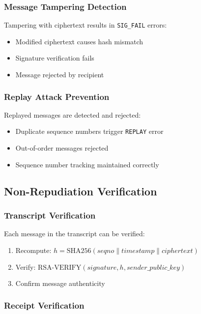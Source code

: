 \documentclass[runningheads]{llncs}
\begin{document}
\subsubsection{Message Tampering Detection}

Tampering with ciphertext results in \texttt{SIG\_FAIL} errors:
\begin{itemize}
    \item Modified ciphertext causes hash mismatch
    \item Signature verification fails
    \item Message rejected by recipient
\end{itemize}

\subsubsection{Replay Attack Prevention}

Replayed messages are detected and rejected:
\begin{itemize}
    \item Duplicate sequence numbers trigger \texttt{REPLAY} error
    \item Out-of-order messages rejected
    \item Sequence number tracking maintained correctly
\end{itemize}

\subsection{Non-Repudiation Verification}

\subsubsection{Transcript Verification}

Each message in the transcript can be verified:
\begin{enumerate}
    \item Recompute: $h = \text{SHA256}(seqno \| timestamp \| ciphertext)$
    \item Verify: $\text{RSA-VERIFY}(signature, h, sender\_public\_key)$
    \item Confirm message authenticity
\end{enumerate}

\subsubsection{Receipt Verification}
\end{document}
